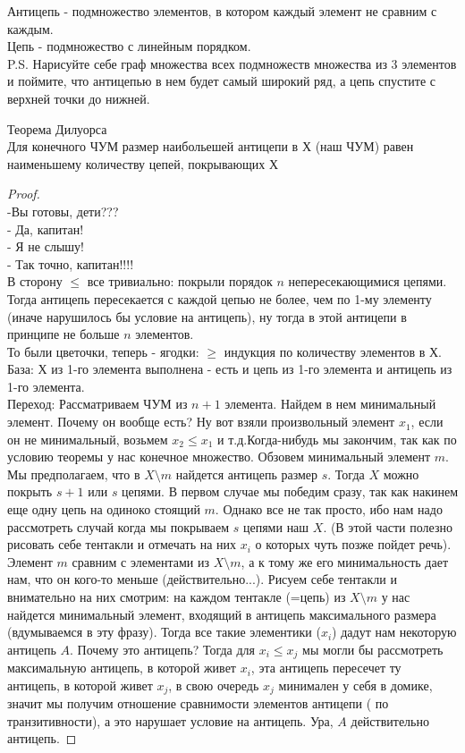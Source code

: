 Антицепь - подмножество элементов, в котором каждый элемент не сравним с каждым. \\
Цепь  - подмножество с линейным порядком. \\
P.S. Нарисуйте себе граф множества всех подмножеств множества из 3 элементов и поймите, что антицепью в нем будет самый широкий ряд, а цепь спустите с верхней точки до нижней.

\begin{theorem}{Теорема Дилуорса}\\ \thmslashn
Для конечного ЧУМ размер наибольешей антицепи в Х (наш ЧУМ) равен наименьшему количеству цепей, покрывающих Х
	\begin{proof} \thmslashn
\\-Вы готовы, дети???\\
- Да, капитан!\\
- Я не слышу!\\
- Так точно, капитан!!!!\\
В сторону $\leq$ все тривиально: покрыли порядок $n$ непересекающимися цепями. Тогда антицепь пересекается с каждой цепью не более, чем по 1-му элементу (иначе нарушилось бы условие на антицепь), ну тогда в этой антицепи в принципе не больше $n$ элементов. \\
То были цветочки, теперь -  ягодки: $\geq$ индукция по количеству элементов в Х.\\
База: Х из 1-го элемента выполнена - есть и цепь из 1-го элемента и антицепь из 1-го элемента.\\

Переход: Рассматриваем ЧУМ из $n+1$ элемента. Найдем в нем минимальный элемент. Почему он вообще есть? Ну вот взяли произвольный элемент $x_1$, если он не минимальный, возьмем $x_2 \leq x_1$ и т.д.Когда-нибудь мы закончим, так как по условию теоремы у нас конечное множество. Обзовем минимальный элемент $m$. Мы предполагаем, что в $X \setminus m$ найдется антицепь размер $s$. Тогда $X$ можно покрыть $s+1$ или $s$ цепями. В первом случае мы победим сразу, так как накинем еще одну цепь на одиноко стоящий $m$. Однако все не так просто, ибо нам надо рассмотреть случай когда мы покрываем $s$ цепями наш $X$. (В этой части полезно рисовать себе тентакли и отмечать на них $x_i$ о которых чуть позже пойдет речь).\\

Элемент $m$ сравним с элементами из $X\setminus m$, а к тому же его минимальность дает нам, что он кого-то меньше (действительно...). Рисуем себе тентакли и внимательно на них смотрим: на каждом тентакле (=цепь) из $X \setminus m$ у нас найдется минимальный элемент, входящий в антицепь максимального размера (вдумываемся в эту фразу). Тогда все такие элементики ($x_i$) дадут нам некоторую антицепь $A$. Почему это антицепь? Тогда для $x_i \leq x_j$ мы могли бы рассмотреть максимальную антицепь, в которой живет $x_i$, эта антицепь пересечет ту антицепь, в которой живет $x_j$, в свою очередь $x_j$ минимален у себя в домике, значит мы получим отношение сравнимости элементов антицепи ( по транзитивности), а это нарушает условие на антицепь. Ура, $A$ действительно антицепь.


\end{proof}
\end{theorem}
